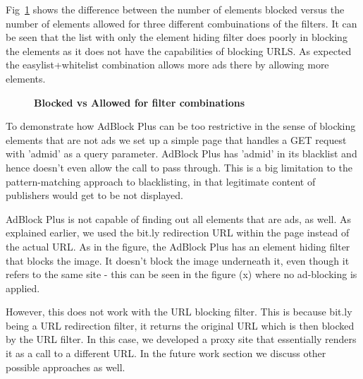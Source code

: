 Fig~\ref{fig:block-allow} shows the difference between the number of  elements  blocked  versus the number of elements allowed for three different  combuinations of the filters.
It can be seen that the list with only the element hiding filter does poorly in blocking the  elements as it does not have the capabilities of blocking URLS.
As expected the easylist+whitelist combination allows more ads there by allowing more elements.
\begin{figure}
	\centering
	\vspace*{-0.5cm}
	\caption{\textbf{Blocked vs Allowed for filter combinations}}
	\label{fig:block-allow}
	\vspace*{-0.5cm}
\end{figure}

To demonstrate how AdBlock Plus can be too restrictive in the sense of blocking elements that are not ads we set up a simple page that handles a GET request with 'admid' as a query parameter. AdBlock Plus has 'admid' in its blacklist and hence doesn't even allow the call to pass through. This is a big limitation to the pattern-matching approach to blacklisting, in that legitimate content of publishers would get to be not displayed.

AdBlock Plus is not capable of finding out all elements that are ads, as well. As explained earlier, we used the bit.ly redirection URL within the page instead of the actual URL. As in the figure, the AdBlock Plus has an element hiding filter that blocks the image. It doesn't block the image underneath it, even though it refers to the same site - this can be seen in the figure (x) where no ad-blocking is applied.

However, this does not work with the URL blocking filter. This is because bit.ly being a URL redirection filter, it returns the original URL which is then blocked by the URL filter. In this case, we developed a proxy site that essentially renders it as a call to a different URL. In the future work section we discuss other possible approaches as well.


